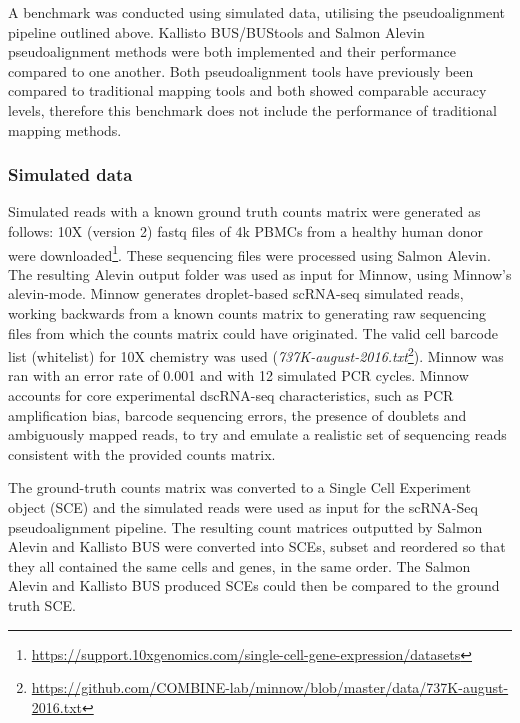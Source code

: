 A benchmark was conducted using simulated data, utilising the pseudoalignment pipeline outlined above.
Kallisto BUS/BUStools and Salmon Alevin pseudoalignment methods were both implemented and their performance compared to one another.
Both pseudoalignment tools have previously been compared to traditional mapping tools\cite{melsted2018barcode, srivastava2019alevin} and both showed comparable accuracy levels, therefore this benchmark does not include the performance of traditional mapping methods.

\subsubsection{Simulated data}
Simulated reads with a known ground truth counts matrix were generated as follows:
10X (version 2) fastq files of 4k PBMCs from a healthy human donor were downloaded\footnote{\url{https://support.10xgenomics.com/single-cell-gene-expression/datasets}}.
These sequencing files were processed using Salmon Alevin.
The resulting Alevin output folder was used as input for Minnow, using Minnow's alevin-mode.
Minnow generates droplet-based scRNA-seq simulated reads, working backwards from a known counts matrix to generating raw sequencing files from which the counts matrix could have originated.
The valid cell barcode list (whitelist) for 10X chemistry was used (\textit{737K-august-2016.txt}\footnote{\url{https://github.com/COMBINE-lab/minnow/blob/master/data/737K-august-2016.txt}}).
Minnow was ran with an error rate of 0.001 and with 12 simulated PCR cycles.
Minnow accounts for core experimental dscRNA-seq characteristics, such as PCR amplification bias, barcode sequencing errors, the presence of doublets and ambiguously mapped reads, to try and emulate a realistic set of sequencing reads consistent with the provided counts matrix.

The ground-truth counts matrix was converted to a Single Cell Experiment object (SCE) and the simulated reads were used as input for the scRNA-Seq pseudoalignment pipeline.
The resulting count matrices outputted by Salmon Alevin and Kallisto BUS were converted into SCEs, subset and reordered so that they all contained the same cells and genes, in the same order.
The Salmon Alevin and Kallisto BUS produced SCEs could then be compared to the ground truth SCE.

